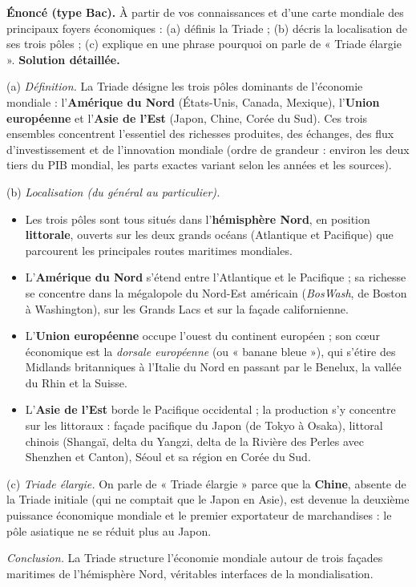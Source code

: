 \documentclass[11pt]{article}
\newcommand{\cle}[1]{{\popxbold\color{popdark}#1}}
\begin{document}
\begin{exoresolu}
\textbf{Énoncé (type Bac).} À partir de vos connaissances et d'une carte mondiale des principaux foyers économiques : (a) définis la Triade ; (b) décris la localisation de ses trois pôles ; (c) explique en une phrase pourquoi on parle de « Triade élargie ».
\tcblower
\textbf{Solution détaillée.}

(a) \emph{Définition.} La \cle{Triade} désigne les trois pôles dominants de l'économie mondiale : l'\textbf{Amérique du Nord} (États-Unis, Canada, Mexique), l'\textbf{Union européenne} et l'\textbf{Asie de l'Est} (Japon, Chine, Corée du Sud). Ces trois ensembles concentrent l'essentiel des richesses produites, des échanges, des flux d'investissement et de l'innovation mondiale (ordre de grandeur : environ les deux tiers du PIB mondial, les parts exactes variant selon les années et les sources).

(b) \emph{Localisation (du général au particulier).}
\begin{itemize}
\item Les trois pôles sont tous situés dans l'\textbf{hémisphère Nord}, en position \textbf{littorale}, ouverts sur les deux grands océans (Atlantique et Pacifique) que parcourent les principales routes maritimes mondiales.
\item L'\textbf{Amérique du Nord} s'étend entre l'Atlantique et le Pacifique ; sa richesse se concentre dans la mégalopole du Nord-Est américain (\emph{BosWash}, de Boston à Washington), sur les Grands Lacs et sur la façade californienne.
\item L'\textbf{Union européenne} occupe l'ouest du continent européen ; son cœur économique est la \emph{dorsale européenne} (ou « banane bleue »), qui s'étire des Midlands britanniques à l'Italie du Nord en passant par le Benelux, la vallée du Rhin et la Suisse.
\item L'\textbf{Asie de l'Est} borde le Pacifique occidental ; la production s'y concentre sur les littoraux : façade pacifique du Japon (de Tokyo à Osaka), littoral chinois (Shangaï, delta du Yangzi, delta de la Rivière des Perles avec Shenzhen et Canton), Séoul et sa région en Corée du Sud.
\end{itemize}

(c) \emph{Triade élargie.} On parle de « Triade élargie » parce que la \textbf{Chine}, absente de la Triade initiale (qui ne comptait que le Japon en Asie), est devenue la deuxième puissance économique mondiale et le premier exportateur de marchandises : le pôle asiatique ne se réduit plus au Japon.

\emph{Conclusion.} La Triade structure l'économie mondiale autour de trois façades maritimes de l'hémisphère Nord, véritables interfaces de la mondialisation.
\end{exoresolu}
\end{document}
